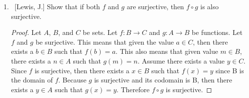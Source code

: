 \documentclass[10pt]{article}
\begin{document}
\begin{enumerate}
\begin{enumerate}
\begin{proof}
 \end{proof}
	\item  ~[Lewis, J.] Show that if both $f$ and $g$ are surjective, then $f \circ g$ is also surjective.
\begin{proof}
Let $A$, $B$, and $C$ be sets. Let $f: B \xrightarrow{} C$ and $g: A \xrightarrow{} B$ be functions. Let $f$ and $g$ be surjective. This means that given the value $a \in C$, then there exists a $b \in B$ such that $f(b) = a$.  This also means that given value $m \in B$, there exists a $n \in A$ such that $g(m) = n$.  Assume there exists a value $y \in C$.  Since $f$ is surjective, then there exists a $x \in B$ such that $f(x) = y$ since B is the domain of $f$. Because $g$ is surjective and its codomain is B, then there exists a $y \in A$ such that $g(x) = y$.  Therefore $f \circ g$ is surjective.


 \end{proof}
	
	\end{enumerate}
\end{enumerate}
\end{document}
